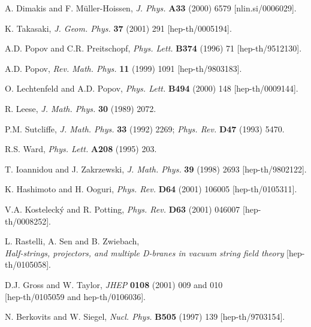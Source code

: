 \documentclass[a4paper,11pt]{article}
\numberwithin{equation}{section}
\begin{document}
\begin{thebibliography}{99}
A. Dimakis and F. M\"uller-Hoissen,
{\sl J. Phys.} {\bf A33} (2000) 6579 [nlin.si/0006029].

K. Takasaki,
{\sl J. Geom. Phys.} {\bf 37} (2001) 291 [hep-th/0005194].

A.D. Popov and C.R. Preitschopf,
{\sl Phys. Lett.} {\bf B374} (1996) 71 [hep-th/9512130].

A.D. Popov,
{\sl Rev. Math. Phys.} {\bf 11} (1999) 1091 [hep-th/9803183].

O. Lechtenfeld and A.D. Popov,
{\sl Phys. Lett.} {\bf B494} (2000) 148 [hep-th/0009144].

R. Leese,
{\sl J. Math. Phys.} {\bf 30} (1989) 2072.

P.M. Sutcliffe,
{\sl J. Math. Phys.} {\bf 33}  (1992) 2269;
{\sl Phys. Rev.} {\bf  D47} (1993) 5470.

R.S. Ward,
{\sl Phys. Lett.} {\bf A208} (1995) 203.

T. Ioannidou and J. Zakrzewski,
{\sl J. Math. Phys.} {\bf 39} (1998) 2693 [hep-th/9802122].

K. Hashimoto and H. Ooguri,
{\sl Phys. Rev.} {\bf D64} (2001) 106005 
[hep-th/0105311].

V.A. Kosteleck\'y and R. Potting,
{\sl Phys. Rev.} {\bf D63} (2001) 046007 [hep-th/0008252].

L. Rastelli, A. Sen and B. Zwiebach,\\
{\it Half-strings, projectors, and multiple D-branes in vacuum
     string field theory} [hep-th/0105058].

D.J. Gross and W. Taylor,
{\sl JHEP} {\bf 0108} (2001) 009 and 010\\
{}[hep-th/0105059 and hep-th/0106036].

N. Berkovits and W. Siegel,
{\sl Nucl. Phys.} {\bf B505} (1997) 139 [hep-th/9703154].


\end{thebibliography}
\end{document}
